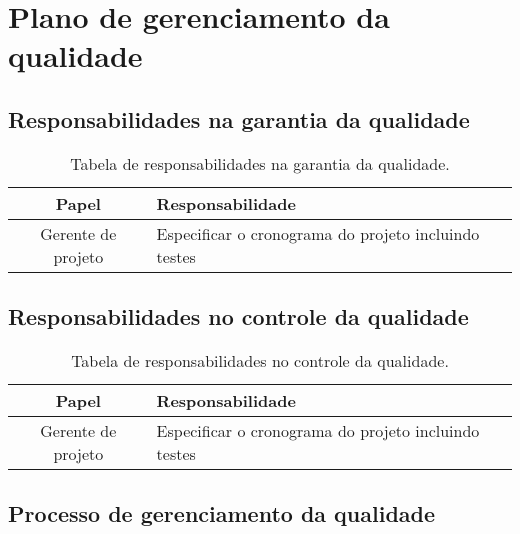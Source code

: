 \chapter{Plano de gerenciamento da qualidade}

\section{Responsabilidades na garantia da qualidade}


\begin{table}[H]
	\begin{tabularx}{\textwidth}{| c | X |}
		\hline
		\textbf{Papel}     & \textbf{Responsabilidade}                            \\
		\hline
		Gerente de projeto & Especificar o cronograma do projeto incluindo testes \\
		\hline
	\end{tabularx}
	\centering
    \caption{Tabela de responsabilidades na garantia da qualidade.}
\end{table}

\section{Responsabilidades no controle da qualidade}


\begin{table}[H]
	\begin{tabularx}{\textwidth}{| c | X |}
		\hline
		\textbf{Papel}     & \textbf{Responsabilidade}                            \\
		\hline
		Gerente de projeto & Especificar o cronograma do projeto incluindo testes \\
		\hline
	\end{tabularx}
	\centering
    \caption{Tabela de responsabilidades no controle da qualidade.}
\end{table}

\section{Processo de gerenciamento da qualidade}


